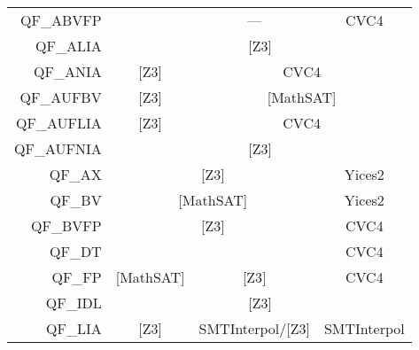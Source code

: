 \begin{table}
{\begin{tabular}{|rccc|}
    QF\_ABVFP                        &                                   & \multicolumn{1}{|c|}{---}                 & \multicolumn{1}{|c|}{CVC4}        \\ \cline{2-4} 
    \multicolumn{1}{|r|}{QF\_ALIA}   & \multicolumn{3}{c|}{{[}Z3{]}}                                                                                     \\ \cline{2-4} 
    \multicolumn{1}{|r|}{QF\_ANIA}   & \multicolumn{1}{c|}{{[}Z3{]}}      & \multicolumn{2}{c|}{CVC4}                                                    \\ \cline{2-4} 
    \multicolumn{1}{|r|}{QF\_AUFBV}  & \multicolumn{1}{c|}{{[}Z3{]}}      & \multicolumn{2}{c|}{{[}MathSAT{]}}                                           \\ \cline{2-4} 
    \multicolumn{1}{|r|}{QF\_AUFLIA} & \multicolumn{1}{c|}{{[}Z3{]}}      & \multicolumn{2}{c|}{CVC4}                                                    \\ \cline{2-4} 
    \multicolumn{1}{|r|}{QF\_AUFNIA} & \multicolumn{3}{c|}{{[}Z3{]}}                                                                                     \\ \cline{2-4} 
    \multicolumn{1}{|r|}{QF\_AX}     & \multicolumn{2}{c|}{{[}Z3{]}}                                                  & \multicolumn{1}{c|}{Yices2}      \\ \cline{2-4} 
    \multicolumn{1}{|r|}{QF\_BV}     & \multicolumn{2}{c|}{{[}MathSAT{]}}                                             & \multicolumn{1}{c|}{Yices2}      \\ \cline{2-4} 
    \multicolumn{1}{|r|}{QF\_BVFP}   & \multicolumn{2}{c|}{{[}Z3{]}}                                                  & \multicolumn{1}{c|}{CVC4}        \\ \cline{2-4} 
    QF\_DT                           &                                    &                                           & \multicolumn{1}{|c|}{CVC4}       \\ \cline{2-4} 
    \multicolumn{1}{|r|}{QF\_FP}     & \multicolumn{1}{c|}{{[}MathSAT{]}} & \multicolumn{1}{c|}{{[}Z3{]}}             & \multicolumn{1}{c|}{CVC4}        \\ \cline{2-4} 
    \multicolumn{1}{|r|}{QF\_IDL}    & \multicolumn{3}{c|}{{[}Z3{]}}                                                                                     \\ \cline{2-4} 
    \multicolumn{1}{|r|}{QF\_LIA}    & \multicolumn{1}{c|}{{[}Z3{]}}      & \multicolumn{1}{c|}{SMTInterpol/{[}Z3{]}} & \multicolumn{1}{c|}{SMTInterpol} \\ \cline{2-4} 

\end{tabular}}
\end{table}
